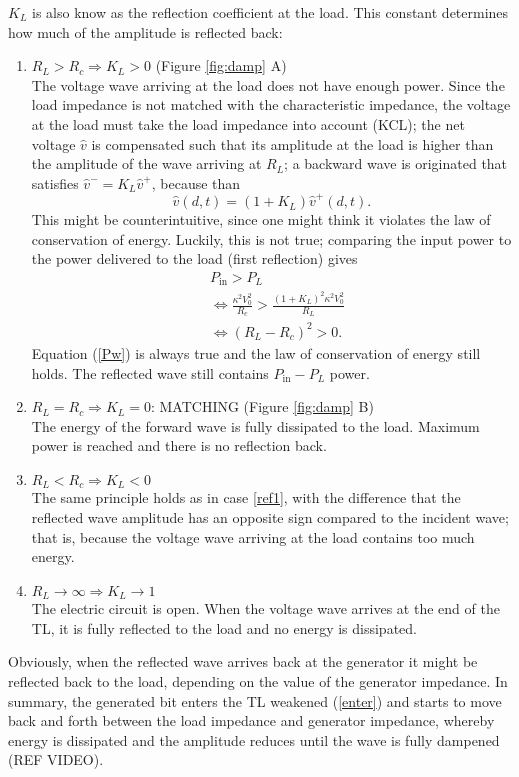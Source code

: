 $K_L$ is also know as the reflection coefficient at the load. This constant determines how much of the amplitude is reflected back:
\begin{enumerate}
\item $R_L > R_c \Rightarrow K_L > 0$ \label{ref1} (Figure \ref{fig:damp} A) \\
	The voltage wave arriving at the load does not have enough power. Since the load impedance is not matched with the characteristic impedance, the voltage at the load must take the load impedance into account (KCL); the net voltage $\hat{v}$ is compensated such that its amplitude at the load is higher than the amplitude of the wave arriving at $R_L$; a backward wave is originated that satisfies $\hat{v}^{-} = K_L\hat{v}^{+}$, because than $$\hat{v}(d, t) = (1 + K_L)\hat{v}^{+}(d, t).$$ This might be counterintuitive, since one might think it violates the law of conservation of energy. Luckily, this is not true; comparing the input power to the power delivered to the load (first reflection) gives
	\begin{align}
		&P_{\text{in}} > P_L \\
		&\Leftrightarrow \frac{\kappa^2 V^2_0}{R_c} > \frac{(1 + K_L)^2\kappa^2V^2_0}{R_L} \\
		&\Leftrightarrow (R_L-R_c)^2 > 0 \label{Pw}.
	\end{align}
Equation (\ref{Pw}) is always true and the law of conservation of energy still holds. The reflected wave still contains $P_{\text{in}} - P_L$ power.
\item $R_L = R_c \Rightarrow K_L = 0$: MATCHING (Figure \ref{fig:damp} B)\\
	The energy of the forward wave is fully dissipated to the load. Maximum power is reached and there is no reflection back.
	
\item $R_L < R_c \Rightarrow K_L <0$ \\
	The same principle holds as in case \ref{ref1}, with the difference that the reflected wave amplitude has an opposite sign compared to the incident wave; that is, because the voltage wave arriving at the load contains too much energy.

\item $R_L \longrightarrow \infty \Rightarrow K_L \longrightarrow 1$ \\
	The electric circuit is open. When the voltage wave arrives at the end of the TL, it is fully reflected to the load and no energy is dissipated.
	
\end{enumerate}
Obviously, when the reflected wave arrives back at the generator it might be reflected back to the load, depending on the value of the generator impedance. In summary, the generated bit enters the TL weakened (\ref{enter}) and starts to move back and forth between the load impedance and generator impedance, whereby energy is dissipated and the amplitude reduces until the wave is fully dampened (REF VIDEO).

